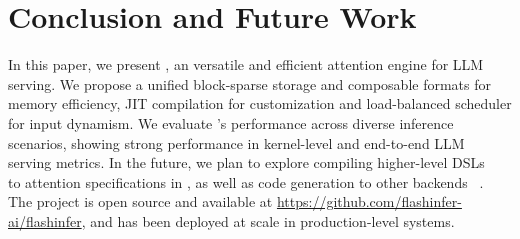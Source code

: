 \section{Conclusion and Future Work}
\label{sec:conclusion-future-work}

In this paper, we present \sys, an versatile and efficient attention engine for LLM serving. We propose a unified block-sparse storage and composable formats for memory efficiency, JIT compilation for customization and load-balanced scheduler for input dynamism. We evaluate \sys's performance across diverse inference scenarios, showing strong performance in kernel-level and end-to-end LLM serving metrics. In the future, we plan to explore compiling higher-level DSLs ~\cite{wu2024mirage, he2024flexattention} to attention specifications in \sys, as well as code generation to other backends ~\cite{ozennvdsl, spector2024thunderkittens, triton}. The \sys project is open source and available at \url{https://github.com/flashinfer-ai/flashinfer}, and has been deployed at scale in production-level systems.
